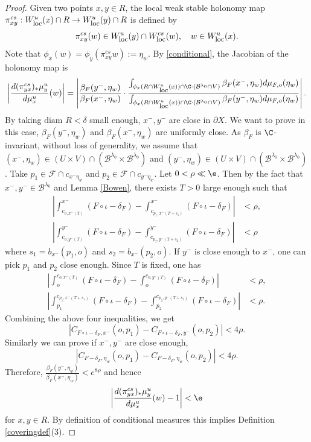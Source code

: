 \documentclass[11pt]{amsart}
\theoremstyle{definition}
\newcommand{\BBB}{\mathcal{B}}
\newcommand{\F}{\mathcal{F}}
\def\pX{{\partial X}}
\def\loc{{\mathop{\hbox{\footnotesize  \rm loc}}}}
\def\b{\beta}
\def\d{\delta}   %
\def\l{\lambda}   \def\L{\Lambda}
\begin{document}
\begin{proof}
Given two points $x, y\in R$, the local weak stable holonomy map $\pi^{cs}_{xy}: W_\loc^{u}(x)\cap R \to W_\loc^{u}(y)\cap R$ is defined by
$$\pi_{xy}^{cs}(w)\in W_\loc^{u}(y)\cap W_\loc^{cs}(w), \quad w\in W_\loc^{u}(x).$$
Note that $\phi_x(w)=\phi_{y}(\pi^{cs}_{xy}w):=\eta_w$. By \eqref{conditional}, the Jacobian of the holonomy map is 
\begin{equation*} 
\begin{aligned}
\left|\frac{d(\pi_{yx}^{cs})_*\mu^u_y}{d\mu^u_x}(w)\right|=\left|\frac{\b_F(y^-,\eta_w)}{\b_F(x^-,\eta_w)}\cdot\frac{\int_{\phi_x(R\cap W_\loc^u(x))\cap \C\cdot(\BBB^{\l_0}\cap V)}\b_F(x^-,\eta_w) d\mu_{F,o} (\eta_w)}{\int_{\phi_x(R\cap W_\loc^u(x))\cap \C\cdot(\BBB^{\l_0}\cap V)}\b_F(y^-,\eta_w) d\mu_{F,o} (\eta_w)}\right|.
\end{aligned}
\end{equation*}
By taking $\text{diam\ }R<\d$ small enough, $x^-,y^-$ are close in $\pX$. We want to prove in this case, $\b_F(y^-,\eta_w)$ and $\b_F(x^-,\eta_w)$ are uniformly close. As $\b_F$ is $\C$-invariant, without loss of generality, we assume that $(x^-,\eta_w)\in (U\times V)\cap (\BBB^{\l_0}\times \BBB^{\l_0})$ and $(y^-,\eta_w)\in (U\times V)\cap (\BBB^{\l_0}\times \BBB^{\l_0})$. Take $p_1\in \F\cap c_{x^-\eta_w}$ and $p_2\in \F\cap c_{y^-\eta_w}$. Let $0<\rho\ll \e$. Then by the fact that $x^-,y^-\in \BBB^{\l_0}$ and Lemma \ref{Bowen}, there exists $T>0$ large enough such that
\begin{equation*}
\begin{aligned}
\left|\int_{c_{o,x^-(T)}}^{x^-}(F\circ\iota-\d_F)-\int_{c_{p_1,x^-(T+s_1)}}^{x^-}(F\circ\iota-\d_F)\right|&<\rho,\\
\left|\int_{c_{o,y^-(T)}}^{y^-}(F\circ\iota-\d_F)-\int_{c_{p_2,y^-(T+s_2)}}^{y^-}(F\circ\iota-\d_F)\right|&<\rho
\end{aligned}
\end{equation*}
where $s_1=b_{x^-}(p_1,o)$ and $s_2=b_{x^-}(p_2,o)$. If $y^-$ is close enough to $x^-$, one can pick $p_1$ and $p_2$ close enough. Since $T$ is fixed, one has
\begin{equation*}
\begin{aligned}
\left|\int_{o}^{c_{o,x^-(T)}}(F\circ\iota-\d_F)-\int_{o}^{c_{o,y^-(T)}}(F\circ\iota-\d_F)\right|&<\rho,\\
\left|\int_{p_1}^{c_{p_1,x^-(T+s_1)}}(F\circ\iota-\d_F)-\int_{p_2}^{c_{p_2,y^-(T+s_2)}}(F\circ\iota-\d_F)\right|&<\rho.
\end{aligned}
\end{equation*}
Combining the above four inequalities, we get 
$$|C_{F\circ \iota-\d_F,x^-}(o, p_1)-C_{F\circ \iota-\d_F,y^-}(o, p_2)|<4\rho.$$ 
Similarly we can prove if $x^-,y^-$ are close enough, 
$$|C_{F-\d_F,\eta_w}(o, p_1)-C_{F-\d_F,\eta_w}(o, p_2)|<4\rho.$$
 Therefore, $\frac{\b_F(y^-,\eta_w)}{\b_F(x^-,\eta_w)}<e^{8\rho}$ and hence
$$\left|\frac{d(\pi_{yx}^{cs})_*\mu^u_y}{d\mu^u_x}(w)-1\right| <\e$$ 
for $x,y\in R$.
By definition of conditional measures this implies Definition \ref{coveringdef}(3).
\end{proof}
\end{document}
